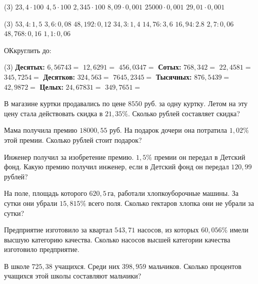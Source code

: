 \begin{class}[number=5]
	\begin{listofex}
		\item \begin{tasks}(3)
			\task \( 23,4\cdot100 \)
			\task\( 4,5 \cdot100 \)
			\task \( 2,345\cdot100 \)
			\task\( 8,09\cdot0,001 \) 
			\task\( 25000 \cdot0,001  \)
			\task\( 29,01\cdot0,001   \)
		\end{tasks}
		\item \begin{tasks}(3)
			\task \( 53,4:1,5 \)
			\task \( 3,6 : 0,08  \)
			\task \( 48,192 : 0,12  \)
			\task \( 34,3:1,4 \)
			\task \( 14,76 : 3,6 \) 
			\task \( 16,94:2.8  \)
			\task \( 2,7 : 0,06 \) 
			\task \( 48,768: 0,16 \)
			\task \(  1,1:0,06 \)
		\end{tasks}
	\item ОКкруглить до:
	\begin{tasks}(3)
		\task[] \textbf{Десятых:}
		\task[]
		\task[]
		\task \( 6,56743 = \)
		\task \( 12, 6291 = \)
		\task \( 456,0347 = \)
		\task[] \textbf{Сотых:}
		\task[]
		\task[]
		\task \( 768,342 = \)
		\task \( 22,4581 = \)
		\task \( 345,7254 = \)
		\task[] \textbf{Десятков:}
		\task[]
		\task[]
		\task \( 324,563 = \)
		\task \( 7645,2345 = \)
		\task[]
		\task[] \textbf{Тысячных:}
		\task[]
		\task[]
		\task \( 876,5439 = \)
		\task \( 42,9872 = \)
		\task[]
		\task[] \textbf{Целых:}
		\task[]
		\task[]
		\task \( 24,67831 = \)
		\task \( 349,7651 = \)
	\end{tasks}
	\item В магазине куртки продавались по цене \( 8550 \) руб. за одну куртку. Летом на эту цену стала действовать скидка в \( 21,35\% \). Сколько рублей составляет скидка?
	\item Мама получила премию \( 18000,55 \) руб. На подарок дочери она потратила \( 1,02\% \) этой премии. Сколько рублей стоит подарок?
	\item Инженер получил за изобретение премию. \( 1,5\% \) премии он передал в Детский фонд. Какую премию получил инженер, если в Детский фонд он передал \( 120,99 \) рублей?
	\item На поле, площадь которого \( 620,5 \) га, работали хлопкоуборочные машины. За сутки они убрали \( 15,815\% \) всего поля. Сколько гектаров хлопка они не убрали за сутки?
	\item Предприятие изготовило за квартал \( 543,71 \) насосов, из которых \( 60,056\% \) имели высшую категорию качества. Сколько насосов высшей категории качества изготовило предприятие.
	\item В школе \( 725,38 \) учащихся. Среди них \( 398,959 \) мальчиков. Сколько процентов учащихся этой школы составляют мальчики?
	\end{listofex}
	
\end{class}

